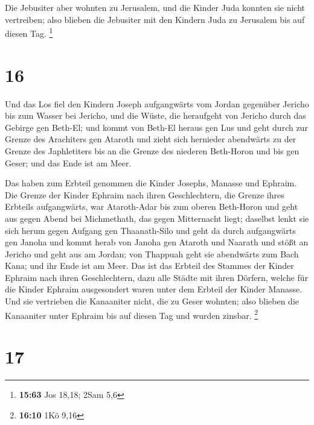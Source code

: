  Die Jebusiter aber wohnten zu Jerusalem, und die Kinder
Juda konnten sie nicht vertreiben; also blieben die Jebusiter mit den
Kindern Juda zu Jerusalem bis auf diesen Tag. \footnote{\textbf{15:63}
  Jos 18,18; 2Sam 5,6}

\hypertarget{section-7}{%
\section{16}\label{section-7}}

 Und das Los fiel den Kindern Joseph aufgangwärts vom
Jordan gegenüber Jericho bis zum Wasser bei Jericho, und die Wüste, die
heraufgeht von Jericho durch das Gebirge gen Beth-El;  und
kommt von Beth-El heraus gen Lus und geht durch zur Grenze des
Arachiters gen Ataroth  und zieht sich hernieder
abendwärts zu der Grenze des Japhletiters bis an die Grenze des niederen
Beth-Horon und bis gen Geser; und das Ende ist am Meer.

 Das haben zum Erbteil genommen die Kinder Josephs,
Manasse und Ephraim.  Die Grenze der Kinder Ephraim nach
ihren Geschlechtern, die Grenze ihres Erbteils aufgangwärts, war
Ataroth-Adar bis zum oberen Beth-Horon  und geht aus gegen
Abend bei Michmethath, das gegen Mitternacht liegt; daselbst lenkt sie
sich herum gegen Aufgang gen Thaanath-Silo und geht da durch
aufgangwärts gen Janoha  und kommt herab von Janoha gen
Ataroth und Naarath und stößt an Jericho und geht aus am Jordan;
 von Thappuah geht sie abendwärts zum Bach Kana; und ihr
Ende ist am Meer. Das ist das Erbteil des Stammes der Kinder Ephraim
nach ihren Geschlechtern,  dazu alle Städte mit ihren
Dörfern, welche für die Kinder Ephraim ausgesondert waren unter dem
Erbteil der Kinder Manasse.  Und sie vertrieben die
Kanaaniter nicht, die zu Geser wohnten; also blieben die Kanaaniter
unter Ephraim bis auf diesen Tag und wurden zinsbar. \footnote{\textbf{16:10}
  1Kö 9,16}

\hypertarget{section-8}{%
\section{17}\label{section-8}}

